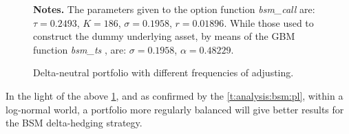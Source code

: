 \documentclass[a4paper, 12pt]{report}
\begin{document}
\begin{figure}[h]
  \centering
  
  \caption{Delta-neutral portfolio with different frequencies of adjusting.}
  \begin{changemargin}{0.5cm}{0.5cm}
  \medskip
\footnotesize
{}\textbf{Notes.} The parameters given to the option function \textit{bsm\_call} are: $\tau = 0.2493$, $K = 186$, $\sigma = 0.1958$, $r = 0.01896$. While those used to construct the dummy underlying asset, by means of the GBM function \textit{bsm\_ts} , are: $\sigma = 0.1958$, $\alpha = 0.48229$.
  \end{changemargin}
  \label{p:analysis:gbm:hedges}
\end{figure}

In the light of the above \cref{p:analysis:gbm:hedges}, and as confirmed by the \cref{t:analysis:bsm:pl}, within a log-normal world, a portfolio more regularly balanced will give better results for the BSM delta-hedging strategy.
    
\end{document}
